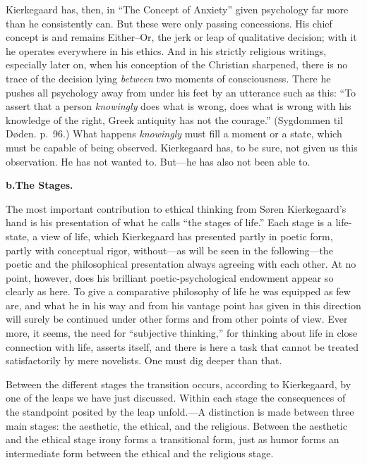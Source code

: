 \documentclass[12pt,a4paper]{book}
\newcommand{\opage}[1]{\marginnote{\footnotesize\textit{[#1]}}}
\begin{document}
Kierkegaard has, then, in ``The Concept of Anxiety'' given psychology far
more than he consistently can. But these were only passing concessions.
His chief concept is and remains Either--Or, the jerk or leap of
qualitative decision; with it he operates everywhere in his
\opage{82}ethics. And in his strictly religious writings, especially later
on, when his conception of the Christian sharpened, there is no trace of
the decision lying \textit{between} two moments of consciousness. There he
pushes all psychology away from under his feet by an utterance such as
this: ``To assert that a person \textit{knowingly} does what is wrong,
does what is wrong with his knowledge of the right, Greek antiquity has
not the courage.''
(Sygdommen til Døden. p.~96.) What happens \textit{knowingly} must fill a
moment or a state, which must be capable of being observed. Kierkegaard
has, to be sure, not given us this observation. He has not wanted to.
But---he has also not been able to.

\begin{center}\textbf{b.\enspace The Stages.}\end{center}

The most important contribution to ethical thinking from Søren
Kierkegaard's hand is his presentation of what he calls ``the stages of
life.'' Each stage is a life-state, a view of life, which Kierkegaard has
presented partly in poetic form, partly with conceptual rigor,
without---as will be seen in the following---the poetic and the
philosophical presentation always agreeing with each other. At no point,
however, does his brilliant poetic-psychological endowment appear so
clearly as here. To give a comparative philosophy of life he was equipped
as few are, and what he in his way and from his vantage point has given in
this direction will surely be continued under other forms and from other
points of view. Ever more, it seems, the need for ``subjective thinking,''
for thinking about life in close connection with life, asserts itself, and
there is here a task that cannot be treated satisfactorily by mere
novelists. One must dig deeper than that.

\opage{83}Between the different stages the transition occurs, according to
Kierkegaard, by one of the leaps we have just discussed. Within each
stage the consequences of the standpoint posited by the leap unfold.---A
distinction is made between three main stages: the aesthetic, the ethical,
and the religious. Between the aesthetic and the ethical stage irony forms
a transitional form, just as humor forms an intermediate form between the
ethical and the religious stage.
\end{document}
